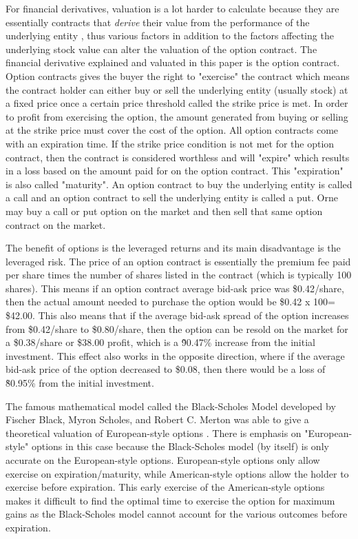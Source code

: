 \documentclass[12pt, letterpaper]{article}
\begin{document}
For financial derivatives, valuation is a lot harder to calculate because they are essentially contracts that \textit{derive} their value from the performance of the underlying entity \cite{derivativefinancewikipedia}, thus various factors in addition to the factors affecting the underlying stock value can alter the valuation of the option contract. 
The financial derivative explained and valuated in this paper is the option contract. 
Option contracts gives the buyer the right to "exercise" the contract which means the contract holder can either buy or sell the underlying entity (usually stock) at a fixed price once a certain price threshold called the strike price is met.
In order to profit from exercising the option, the amount generated from buying or selling at the strike price must cover the cost of the option.
All option contracts come with an expiration time.
If the strike price condition is not met for the option contract, then the contract is considered worthless and will "expire" which results in a loss based on the amount paid for on the option contract.
This "expiration" is also called "maturity".
An option contract to buy the underlying entity is called a call and an option contract to sell the underlying entity is called a put.
Orne may buy a call or put option on the market and then sell that same option contract on the market.

The benefit of options is the leveraged returns and its main disadvantage is the leveraged risk.
The price of an option contract is essentially the premium fee paid per share times the number of shares listed in the contract (which is typically 100 shares).
This means if an option contract average bid-ask price was \$0.42/share, then the actual amount needed to purchase the option would be \$0.42 x 100= \$42.00.
This also means that if the average bid-ask spread of the option increases from \$0.42/share to \$0.80/share, then the option can be resold on the market for a \$0.38/share or \$38.00 profit, which is a \~90.47\% increase from the initial investment.
This effect also works in the opposite direction, where if the average bid-ask price of the option decreased to \$0.08, then there would be a loss of \~80.95\% from the initial investment.

The famous mathematical model called the Black-Scholes Model developed by Fischer Black, Myron Scholes, and Robert C. Merton was able to give a theoretical valuation of European-style options \cite{blackscholesmodelwikipedia}.
There is emphasis on "European-style" options in this case because the Black-Scholes model (by itself) is only accurate on the European-style options.
European-style options only allow exercise on expiration/maturity, while American-style options allow the holder to exercise before expiration.
This early exercise of the American-style options makes it difficult to find the optimal time to exercise the option for maximum gains \cite{blackscholesmodelwikipedia} as the Black-Scholes model cannot account for the various outcomes before expiration. 
\end{document}
